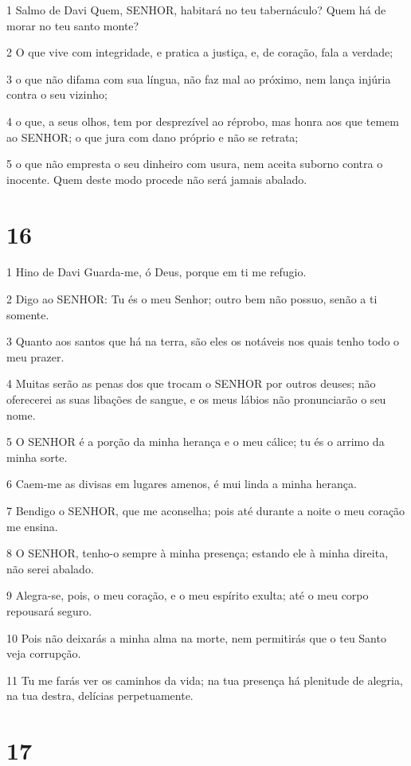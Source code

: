 \par 1 Salmo de Davi Quem, SENHOR, habitará no teu tabernáculo? Quem há de morar no teu santo monte?
\par 2 O que vive com integridade, e pratica a justiça, e, de coração, fala a verdade;
\par 3 o que não difama com sua língua, não faz mal ao próximo, nem lança injúria contra o seu vizinho;
\par 4 o que, a seus olhos, tem por desprezível ao réprobo, mas honra aos que temem ao SENHOR; o que jura com dano próprio e não se retrata;
\par 5 o que não empresta o seu dinheiro com usura, nem aceita suborno contra o inocente. Quem deste modo procede não será jamais abalado.

\chapter{16}

\par 1 Hino de Davi Guarda-me, ó Deus, porque em ti me refugio.
\par 2 Digo ao SENHOR: Tu és o meu Senhor; outro bem não possuo, senão a ti somente.
\par 3 Quanto aos santos que há na terra, são eles os notáveis nos quais tenho todo o meu prazer.
\par 4 Muitas serão as penas dos que trocam o SENHOR por outros deuses; não oferecerei as suas libações de sangue, e os meus lábios não pronunciarão o seu nome.
\par 5 O SENHOR é a porção da minha herança e o meu cálice; tu és o arrimo da minha sorte.
\par 6 Caem-me as divisas em lugares amenos, é mui linda a minha herança.
\par 7 Bendigo o SENHOR, que me aconselha; pois até durante a noite o meu coração me ensina.
\par 8 O SENHOR, tenho-o sempre à minha presença; estando ele à minha direita, não serei abalado.
\par 9 Alegra-se, pois, o meu coração, e o meu espírito exulta; até o meu corpo repousará seguro.
\par 10 Pois não deixarás a minha alma na morte, nem permitirás que o teu Santo veja corrupção.
\par 11 Tu me farás ver os caminhos da vida; na tua presença há plenitude de alegria, na tua destra, delícias perpetuamente.

\chapter{17}

